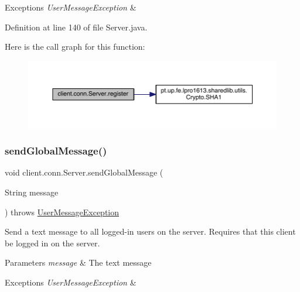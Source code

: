 \begin{DoxyExceptions}{Exceptions}
{\em User\+Message\+Exception} & \\
\hline
\end{DoxyExceptions}


Definition at line 140 of file Server.\+java.

Here is the call graph for this function\+:
\nopagebreak
\begin{figure}[H]
\begin{center}
\leavevmode
\includegraphics[width=350pt]{classclient_1_1conn_1_1_server_a945189dab00f6350cb5a444a910c4dd5_cgraph}
\end{center}
\end{figure}
\hypertarget{classclient_1_1conn_1_1_server_acbe845e1fc6ba7857fcf6d01377f5432}{}\label{classclient_1_1conn_1_1_server_acbe845e1fc6ba7857fcf6d01377f5432} 
\subsubsection{\texorpdfstring{send\+Global\+Message()}{sendGlobalMessage()}}
{\footnotesize\ttfamily void client.\+conn.\+Server.\+send\+Global\+Message (\begin{DoxyParamCaption}\item[{String}]{message }\end{DoxyParamCaption}) throws \hyperlink{classpt_1_1up_1_1fe_1_1lpro1613_1_1sharedlib_1_1exceptions_1_1_user_message_exception}{User\+Message\+Exception}}

Send a text message to all logged-\/in users on the server. Requires that this client be logged in on the server. 
\begin{DoxyParams}{Parameters}
{\em message} & The text message \\
\hline
\end{DoxyParams}

\begin{DoxyExceptions}{Exceptions}
{\em User\+Message\+Exception} & \\
\hline
\end{DoxyExceptions}


